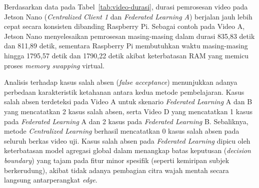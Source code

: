 \documentclass[conference]{IEEEtran}
\begin{document}
\begin{table}[H]
\caption{Hasil Pengujian Durasi Pemrosesan Video Simulasi (detik)}
\begin{center}
\label{tab:video-durasi}
\end{center}
\end{table}

Berdasarkan data pada Tabel~\ref{tab:video-durasi}, durasi pemrosesan video pada Jetson Nano (\textit{Centralized Client 1} dan \textit{Federated Learning A}) berjalan jauh lebih cepat secara konsisten dibanding Raspberry Pi. Sebagai contoh pada Video A, Jetson Nano menyelesaikan pemrosesan masing-masing dalam durasi 835,83 detik dan 811,89 detik, sementara Raspberry Pi membutuhkan waktu masing-masing hingga 1795,57 detik dan 1790,22 detik akibat keterbatasan RAM yang memicu proses \textit{memory swapping} virtual.

Analisis terhadap kasus salah absen (\textit{false acceptance}) menunjukkan adanya perbedaan karakteristik ketahanan antara kedua metode pembelajaran. Kasus salah absen terdeteksi pada Video A untuk skenario \textit{Federated Learning} A dan B yang mencatatkan 2 kasus salah absen, serta Video D yang mencatatkan 1 kasus pada \textit{Federated Learning} A dan 2 kasus pada \textit{Federated Learning} B. Sebaliknya, metode \textit{Centralized Learning} berhasil mencatatkan 0 kasus salah absen pada seluruh berkas video uji. Kasus salah absen pada \textit{Federated Learning} dipicu oleh keterbatasan model agregasi global dalam menangkap batas keputusan (\textit{decision boundary}) yang tajam pada fitur minor spesifik (seperti kemiripan subjek berkerudung), akibat tidak adanya pembagian citra wajah mentah secara langsung antarperangkat \textit{edge}.
\end{document}
